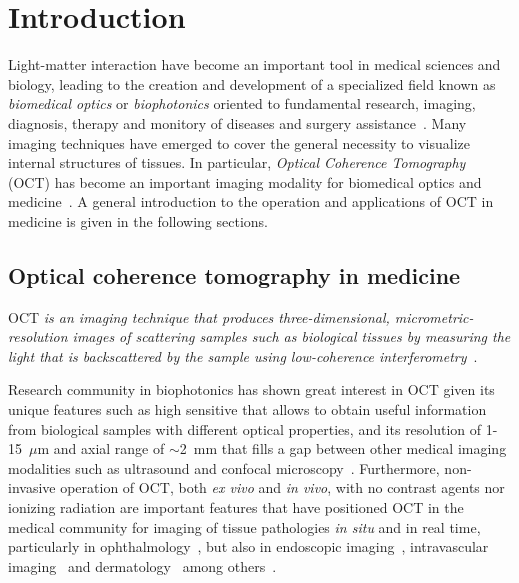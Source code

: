 \newpage
{}
\chapter{Introduction}\label{chap:intro}

Light-matter interaction have become an important tool in medical sciences and biology, leading to the creation and development of a specialized field known as \textit{biomedical optics} or \textit{biophotonics} oriented to fundamental research, imaging, diagnosis, therapy and monitory of diseases and surgery assistance~\cite{Keiser2016_Biophotonics}. Many imaging techniques have emerged to cover the general necessity to visualize internal structures of tissues. In particular, \textit{Optical Coherence Tomography} (OCT) has become an important imaging modality for biomedical optics and medicine~\cite{Keiser2016_Biophotonics, Fujimoto2015_Optical}. A general introduction to the operation and applications of OCT in medicine is given in the following sections.

\section{Optical coherence tomography in medicine}

OCT \textit{is an imaging technique that produces three-dimensional, micrometric-resolution images of scattering samples such as biological tissues by measuring the light that is backscattered by the sample using low-coherence interferometry}~\cite{Huang1991_Optical, Fujimoto2015_Optical}.

Research community in biophotonics has shown great interest in OCT given its unique features such as high sensitive that allows to obtain useful information from biological samples with different optical properties, and its resolution of 1-15~$\mu$m and axial range of $\sim$2~mm that fills a gap between other medical imaging modalities such as ultrasound and confocal microscopy~\cite{Fujimoto2015_Introduction}. Furthermore, non-invasive operation of OCT, both \textit{ex vivo} and \textit{in vivo}, with no contrast agents nor ionizing radiation are important features that have positioned OCT in the medical community for imaging of tissue pathologies \textit{in situ} and in real time, particularly in ophthalmology~\cite{Swanson1993_vivo, Schuman2004_Optical}, but also in endoscopic imaging~\cite{Tearney1997_vivo}, intravascular imaging~\cite{Tearney1996_CatheterBased, Bouma2017_Intravascular} and dermatology~\cite{Welzel1997_Optical, Olsen2018_Advances} among others~\cite{Colston1998_Imaging, Suter2012_Optical, Vakoc2012_Cancer}.

